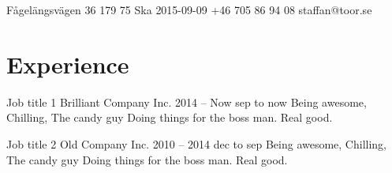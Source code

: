 \documentclass{sobCV}[2015/09/08]
\begin{document}

               {Fågelängsvägen 36}
               {179 75 Ska}
               {2015-09-09}
               {+46 705 86 94 08}
               {staffan@toor.se}




   \section{Experience}
      \experiencenode
      {Job title 1}                                      %
      {Brilliant Company Inc.}                           %
      {2014 -- Now}                                      %
      {sep to now}{                                      %
         Being awesome,
         Chilling,
         The candy guy
      }{
      Doing things for the boss man. Real good.
   }

   \experiencenode
      {Job title 2}                                      %
      {Old Company Inc.}                                 %
      {2010 -- 2014}                                     %
      {dec to sep}{                                      %
         Being awesome,
         Chilling,
         The candy guy
      }{
      Doing things for the boss man. Real good.
   }
\end{document}
